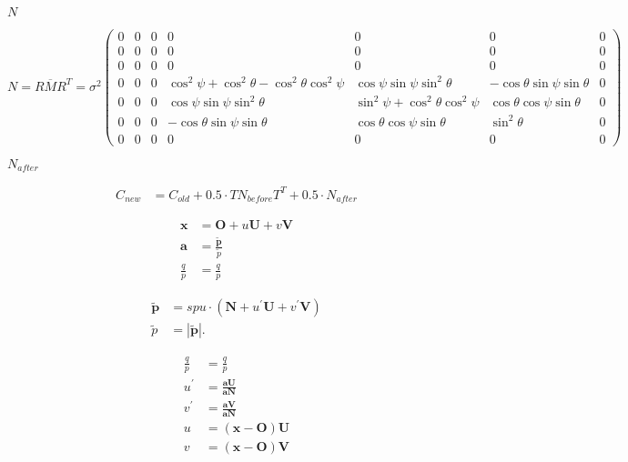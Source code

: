\documentclass{article}
\begin{document}
$N$
\pagebreak

\[ N=R\overline{M}R^{T}=\sigma^{2}\left(\begin{array}{ccccccc} 0 & 0 & 0 & 0 & 0 & 0 & 0\\ 0 & 0 & 0 & 0 & 0 & 0 & 0\\ 0 & 0 & 0 & 0 & 0 & 0 & 0\\ 0 & 0 & 0 & \cos^{2}\psi+\cos^{2}\theta-\cos^{2}\theta\cos^{2}\psi & \cos\psi\sin\psi\sin^{2}\theta & -\cos\theta\sin\psi\sin\theta & 0\\ 0 & 0 & 0 & \cos\psi\sin\psi\sin^{2}\theta & \sin^{2}\psi+\cos^{2}\theta\cos^{2}\psi & \cos\theta\cos\psi\sin\theta & 0\\ 0 & 0 & 0 & -\cos\theta\sin\psi\sin\theta & \cos\theta\cos\psi\sin\theta & \sin^{2}\theta & 0\\ 0 & 0 & 0 & 0 & 0 & 0 & 0\end{array}\right)\]
\pagebreak

$N_{after}$
\pagebreak

\begin{eqnarray*} C_{new} & = C_{old} + 0.5 \cdot T N_{before} T^{T} + 0.5 \cdot N_{after} \end{eqnarray*}
\pagebreak

\begin{eqnarray*} \boldsymbol{\mathbf{x}} & = \boldsymbol{\mathbf{O}}+u\boldsymbol{\mathbf{U}}+v\boldsymbol{\mathbf{V}} \\ \boldsymbol{\mathbf{a}} & = \frac{\boldsymbol{\mathbf{\widetilde{p}}}}{\widetilde{p}} \\ \frac{q}{p} & = \frac{q}{p} \end{eqnarray*}
\pagebreak

\begin{eqnarray*} \boldsymbol{\mathbf{\widetilde{p}}} & = spu \cdot \left(\boldsymbol{\mathbf{N}}+u^{\prime} \boldsymbol{\mathbf{U}} + v^{\prime} \boldsymbol{\mathbf{V}}\right) \\ \widetilde{p} & = \left| \boldsymbol{\mathbf{\widetilde{p}}} \right| \textrm{.} \end{eqnarray*}
\pagebreak

\begin{eqnarray*} \frac{q}{p} & = \frac{q}{p} \\ u^{\prime} & = \frac{\boldsymbol{\mathbf{a}} \boldsymbol{\mathbf{U}}}{\boldsymbol{\mathbf{a}} \boldsymbol{\mathbf{N}}} \\ v^{\prime} & = \frac{\boldsymbol{\mathbf{a}} \boldsymbol{\mathbf{V}}}{\boldsymbol{\mathbf{a}} \boldsymbol{\mathbf{N}}} \\ u & = \left(\boldsymbol{\mathbf{x}}-\boldsymbol{\mathbf{O}}\right)\boldsymbol{\mathbf{U}}\\ v & = \left(\boldsymbol{\mathbf{x}}-\boldsymbol{\mathbf{O}}\right)\boldsymbol{\mathbf{V}}\\ \end{eqnarray*}
\pagebreak
\end{document}
